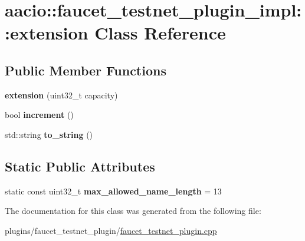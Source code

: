 \hypertarget{classaacio_1_1faucet__testnet__plugin__impl_1_1extension}{}\section{aacio\+:\+:faucet\+\_\+testnet\+\_\+plugin\+\_\+impl\+:\+:extension Class Reference}
\label{classaacio_1_1faucet__testnet__plugin__impl_1_1extension}
\subsection*{Public Member Functions}
\begin{DoxyCompactItemize}
\item 
\mbox{\label{classaacio_1_1faucet__testnet__plugin__impl_1_1extension_a2118c82c83c6e38adcae7c14f1d9c25c}} 
{\bfseries extension} (uint32\+\_\+t capacity)
\item 
\mbox{\label{classaacio_1_1faucet__testnet__plugin__impl_1_1extension_a9cfea289fb1bb1d12837afd488a41f13}} 
bool {\bfseries increment} ()
\item 
\mbox{\label{classaacio_1_1faucet__testnet__plugin__impl_1_1extension_ace6e993861a51966655ebb4fbbac54bb}} 
std\+::string {\bfseries to\+\_\+string} ()
\end{DoxyCompactItemize}
\subsection*{Static Public Attributes}
\begin{DoxyCompactItemize}
\item 
\mbox{\label{classaacio_1_1faucet__testnet__plugin__impl_1_1extension_a78fab03d41aa026867fccccc8b1a59dd}} 
static const uint32\+\_\+t {\bfseries max\+\_\+allowed\+\_\+name\+\_\+length} = 13
\end{DoxyCompactItemize}


The documentation for this class was generated from the following file\+:\begin{DoxyCompactItemize}
\item 
plugins/faucet\+\_\+testnet\+\_\+plugin/\mbox{\hyperlink{faucet__testnet__plugin_8cpp}{faucet\+\_\+testnet\+\_\+plugin.\+cpp}}\end{DoxyCompactItemize}
